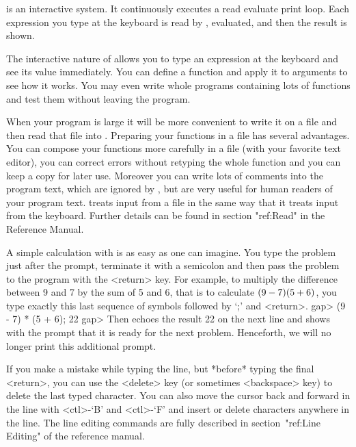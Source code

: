 \null

%
{\GAP}  is  an   interactive   system.    It  continuously   executes   a
read evaluate print loop.  Each  expression you type  at the  keyboard is
read by {\GAP}, evaluated, and then the result is shown.

The interactive nature of {\GAP} allows you to type  an expression at the
keyboard and see its value immediately.  You can  define a  function  and
apply it to arguments  to  see how  it  works.  You may  even write whole
programs containing lots  of functions and test them without leaving  the
program.

When  your program is large it  will be more  convenient to write it on a
file and then read that file  into {\GAP}. Preparing  your functions in a
file   has  several advantages.  You  can   compose  your functions  more
carefully in a  file (with your favorite  text  editor), you can  correct
errors without retyping  the whole function and you  can keep a  copy for
later use. Moreover you can write lots of comments into the program text,
which are ignored  by {\GAP}, but are   very useful for  human readers of
your program text. {\GAP} treats  input from a  file in the same way that
it treats input from the keyboard. Further details can be found in
section "ref:Read" in the Reference Manual.

A simple calculation with {\GAP} is as easy as one can imagine.  You type
the problem just after the prompt, terminate it with a semicolon and then
pass the problem to the  program with the <return> key.  For  example, to
multiply the difference between 9 and 7 by the sum of 5 and 6, that is to
calculate  $(9 - 7) \* (5 + 6)$, you type exactly this  last sequence  of
symbols followed by `;' and <return>.
\beginexample
gap> (9 - 7) * (5 + 6);
22
gap> 
\endexample
Then {\GAP} echoes   the result 22 on the   next line and shows with  the
prompt  that it is ready  for the  next problem.  Henceforth,  we will no
longer print this additional prompt.

%
If you make a mistake while typing the line,
but *before* typing the final <return>,
you can use the <delete> key (or sometimes <backspace> key)
to delete the last typed character.
You can also move the cursor back and forward in the line with <ctl>-`B'
and <ctl>-`F' and insert or delete characters anywhere in the line.
The line editing commands are fully described
in section~"ref:Line Editing" of the reference manual.

